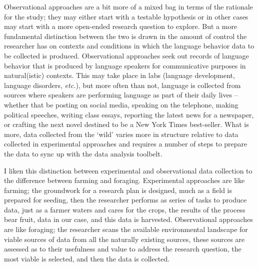 \documentclass[
  letterpaper,
]{latex/krantz}
\begin{document}
Observational approaches are a bit more of a mixed bag in terms of the
rationale for the study; they may either start with a testable
hypothesis or in other cases may start with a more open-ended research
question to explore. But a more fundamental distinction between the two
is drawn in the amount of control the researcher has on contexts and
conditions in which the language behavior data to be collected is
produced. Observational approaches seek out records of language behavior
that is produced by language speakers for communicative purposes in
natural(istic) contexts. This may take place in labs (language
development, language disorders, \emph{etc.}), but more often than not,
language is collected from sources where speakers are performing
language as part of their daily lives --whether that be posting on
social media, speaking on the telephone, making political speeches,
writing class essays, reporting the latest news for a newspaper, or
crafting the next novel destined to be a New York Times best-seller.
What is more, data collected from the `wild' varies more in structure
relative to data collected in experimental approaches and requires a
number of steps to prepare the data to sync up with the data analysis
toolbelt.

I liken this distinction between experimental and observational data
collection to the difference between farming and foraging. Experimental
approaches are like farming; the groundwork for a research plan is
designed, much as a field is prepared for seeding, then the researcher
performs as series of tasks to produce data, just as a farmer waters and
cares for the crops, the results of the process bear fruit, data in our
case, and this data is harvested. Observational approaches are like
foraging; the researcher scans the available environmental landscape for
viable sources of data from all the naturally existing sources, these
sources are assessed as to their usefulness and value to address the
research question, the most viable is selected, and then the data is
collected.
\end{document}
